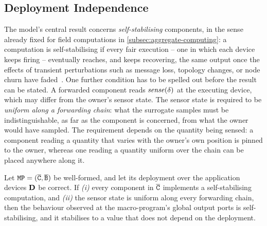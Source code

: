 \subsection{Deployment Independence}
\label{subsec:deployment-independence}

The model's central result concerns \emph{self-stabilising} components,
in the sense already fixed for field computations in \cref{subsec:aggregate-computing}:
a computation is self-stabilising if every fair execution -- one in which each device keeps firing -- eventually reaches, and keeps recovering, the same output once the effects of transient perturbations such as message loss, topology changes, or node churn have faded~\cite{DBLP:journals/tomacs/ViroliABDP18}.
%
One further condition has to be spelled out before the result can be stated.
A forwarded component reads $\mathit{sense}(\delta)$ at the executing device, which may differ from the owner's sensor state.
The sensor state is required to be \emph{uniform along a forwarding chain}:
what the surrogate samples must be indistinguishable, as far as the component is concerned, from what the owner would have sampled.
The requirement depends on the quantity being sensed:
a component reading a quantity that varies with the owner's own position is pinned to the owner,
whereas one reading a quantity uniform over the chain can be placed anywhere along it.

\begin{theorem}
    \label{thm:deployment-independence}
    Let $\mathtt{MP} = (\overline{\mathtt{C}},\overline{\mathtt{B}})$ be well-formed,
    and let its deployment over the application devices $\mathbf{D}$ be correct.
    If \emph{(i)} every component in $\overline{\mathtt{C}}$ implements a self-stabilising computation,
    and \emph{(ii)} the sensor state is uniform along every forwarding chain,
    then the behaviour observed at the macro-program's global output ports is self-stabilising,
    and it stabilises to a value that does not depend on the deployment.
\end{theorem}

